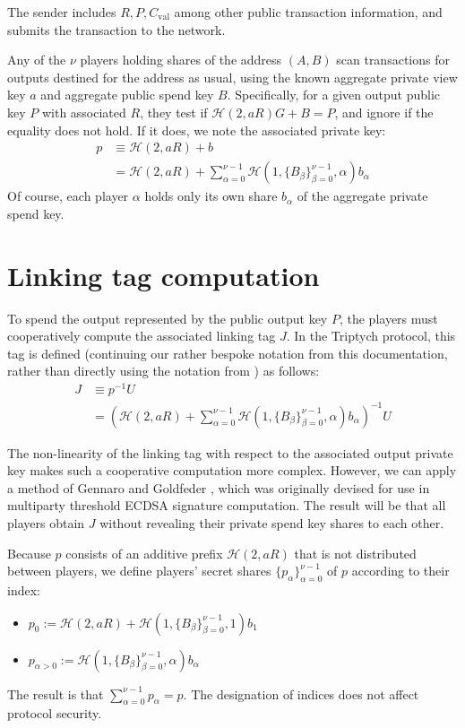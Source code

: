 \documentclass{article}
\newcommand{\hs}{\mathcal{H}}
\begin{document}
The sender includes $R, P, C_{\operatorname{val}}$ among other public transaction information, and submits the transaction to the network.

Any of the $\nu$ players holding shares of the address $(A,B)$ scan transactions for outputs destined for the address as usual, using the known aggregate private view key $a$ and aggregate public spend key $B$.
Specifically, for a given output public key $P$ with associated $R$, they test if $\hs(2,aR)G + B = P$, and ignore if the equality does not hold.
If it does, we note the associated private key:
\begin{align*}
p &\equiv \hs(2,aR) + b \\
&= \hs(2,aR) + \sum_{\alpha=0}^{\nu-1} \hs(1, \{B_\beta\}_{\beta=0}^{\nu-1}, \alpha) b_\alpha
\end{align*}
Of course, each player $\alpha$ holds only its own share $b_\alpha$ of the aggregate private spend key.


\section{Linking tag computation}

To spend the output represented by the public output key $P$, the players must cooperatively compute the associated linking tag $J$.
In the Triptych protocol, this tag is defined (continuing our rather bespoke notation from this documentation, rather than directly using the notation from \cite{triptych}) as follows:
\begin{align*}
J &\equiv p^{-1}U \\
&= \left( \hs(2,aR) + \sum_{\alpha=0}^{\nu-1} \hs(1, \{B_\beta\}_{\beta=0}^{\nu-1}, \alpha) b_\alpha \right)^{-1}U
\end{align*}

The non-linearity of the linking tag with respect to the associated output private key makes such a cooperative computation more complex.
However, we can apply a method of Gennaro and Goldfeder \cite{gennaro}, which was originally devised for use in multiparty threshold ECDSA signature computation.
The result will be that all players obtain $J$ without revealing their private spend key shares to each other.

Because $p$ consists of an additive prefix $\hs(2,aR)$ that is not distributed between players, we define players' secret shares $\{p_\alpha\}_{\alpha=0}^{\nu-1}$ of $p$ according to their index:
\begin{itemize}
    \item $p_0 := \hs(2,aR) + \hs(1, \{B_\beta\}_{\beta=0}^{\nu-1}, 1) b_1$
    \item $p_{\alpha > 0} := \hs(1, \{B_\beta\}_{\beta=0}^{\nu-1}, \alpha) b_\alpha$
\end{itemize}
The result is that $\sum_{\alpha=0}^{\nu-1} p_\alpha = p$.
The designation of indices does not affect protocol security.
\end{document}
